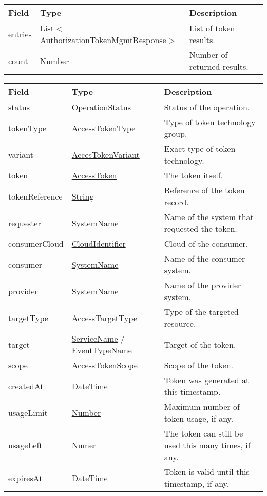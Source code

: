 \documentclass[a4paper]{arrowhead}
\newcommand{\pref}[1]{{\textcolor{ArrowheadGrey}{\hyperref[sec:model:primitives:#1]{#1}}}}
\begin{document}

\begin{table}[ht!]
\begin{tabularx}{\textwidth}{| p{1.5cm} | p{8.2cm} | X |} \hline
\rowcolor{gray!33} Field & Type & Description \\ \hline
entries & \pref{List}$<$\hyperref[sec:model:AuthorizationTokenMgmtResponse]{AuthorizationTokenMgmtResponse}$>$ & List of token results. \\ \hline
count & \pref{Number} & Number of returned results. \\ \hline
\end{tabularx}
\end{table}

\clearpage


\begin{table}[ht!]
\begin{tabularx}{\textwidth}{| p{4.25cm} | p{4.5cm} | X |} \hline
\rowcolor{gray!33} Field & Type & Description \\ \hline
status & \pref{OperationStatus} & Status of the operation. \\ \hline
tokenType & \pref{AccessTokenType} & Type of token technology group. \\ \hline
variant & \pref{AccesTokenVariant} & Exact type of token technology. \\ \hline
token & \pref{AccessToken} & The token itself. \\ \hline
tokenReference & \pref{String} & Reference of the token record. \\ \hline
requester & \pref{SystemName} & Name of the system that requested the token. \\ \hline
consumerCloud & \pref{CloudIdentifier} & Cloud of the consumer. \\ \hline
consumer & \pref{SystemName} & Name of the consumer system. \\ \hline
provider & \pref{SystemName} & Name of the provider system. \\ \hline
targetType & \pref{AccessTargetType} & Type of the targeted resource. \\ \hline
target & \pref{ServiceName} / \pref{EventTypeName} & Target of the token. \\ \hline
scope & \hyperref[sec:model:AccessTokenScope]{AccessTokenScope} & Scope of the token. \\ \hline
createdAt & \pref{DateTime} & Token was generated at this timestamp. \\ \hline
usageLimit & \pref{Number} & Maximum number of token usage, if any. \\ \hline
usageLeft & \pref{Numer} & The token can still be used this many times, if any. \\ \hline
expiresAt & \pref{DateTime} & Token is valid until this timestamp, if any. \\ \hline
\end{tabularx}
\end{table}
\end{document}
